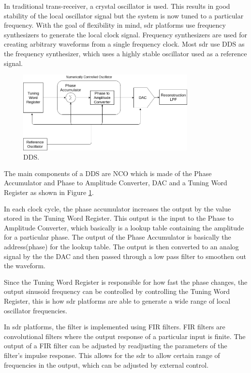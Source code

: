 \begin{itemize}
In traditional trans-receiver, a crystal oscillator is used.
This results in good stability of the local oscillator signal but the system is now tuned to a particular frequency.
With the goal of flexibility in mind, \ac{sdr} platforms use frequency synthesizers to generate the local clock signal.
Frequency synthesizers are used for creating arbitrary waveforms from a single frequency clock.
Most \ac{sdr} use \ac{DDS} as the frequency synthesizer, which uses a highly stable oscillator used as a reference signal.



\begin{figure}[h!]
\centering
\includegraphics[width=0.8\textwidth]{Figure/DDS.png}
\caption{\ac{DDS}.}
\label{dds}
\end{figure}

The main components of a \ac{DDS} are \ac{NCO} which is made of the Phase Accumulator and Phase to Amplitude Converter, \ac{DAC} and a Tuning Word Register as shown in Figure \ref{dds}.

In each clock cycle, the phase accumulator increases the output by the value stored in the Tuning Word Register.
This output is the input to the Phase to Amplitude Converter, which basically is a lookup table containing the amplitude for a particular phase.
The output of the Phase Accumulator is basically the address(phase) for the lookup table.
The output is then converted to an analog signal by the the \ac{DAC} and then passed through a low pass filter to smoothen out the waveform.

Since the Tuning Word Register is responsible for how fast the phase changes, the output sinusoid frequency can be controlled by controlling the Tuning Word Register, this is how \ac{sdr} platforms are able to generate a wide range of local oscillator frequencies.

In \ac{sdr} platforms, the filter is implemented using \ac{FIR} filters.
\ac{FIR} filters are convolutional filters where the output response of a particular input is finite.
The output of a \ac{FIR} filter can be adjusted by readjusting the parameters of the filter's impulse response.
This allows for the \ac{sdr} to allow certain range of frequencies in the output, which can be adjusted by external control.


\end{itemize}
